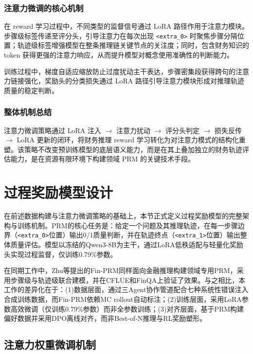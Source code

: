 \documentclass[professional,privacy,print,win,long,STEM,AutoFakeBold]{def/buaa}
\begin{document}
\subsubsection{注意力微调的核心机制}

在 reward 学习过程中，不同类型的监督信号通过 LoRA 路径作用于注意力模块。步骤级标签传递至评分头，引导注意力在每次出现 \texttt{<extra\_0>} 时聚焦步骤分隔位置；轨迹级标签增强模型在整条推理链关键节点的关注度；同时，包含财务知识的 token 获得更强的注意力响应，从而提升模型对概念使用准确性的判断能力。

训练过程中，梯度自适应缩放防止过度扰动主干表达，步骤密集段获得跨句的注意力链接强化，奖励头的分类损失通过 LoRA 路径引导注意力模块形成对推理轨迹质量的稳定判断。

\subsubsection{整体机制总结}

注意力微调策略通过 LoRA 注入 $\rightarrow$ 注意力扰动 $\rightarrow$ 评分头判定 $\rightarrow$ 损失反传 $\rightarrow$ LoRA 更新的闭环，将财务推理 reward 学习转化为对注意力模式的结构化重塑。该策略不改变预训练模型的底层语义能力，而是在其上叠加独立的财务轨迹评估能力，是在资源有限环境下构建领域 PRM 的关键技术手段。


\section{过程奖励模型设计}

在前述数据构建与注意力微调策略的基础上，本节正式定义过程奖励模型的完整架构与训练机制。PRM的核心任务是：给定一个问题及其推理轨迹，在每一步骤边界（\texttt{<extra\_0>}位置）输出0/1质量判断，并在轨迹终点（\texttt{<extra\_1>}位置）输出整体质量评估。模型以冻结的Qwen3-8B为主干，通过LoRA低秩适配与轻量化奖励头实现过程监督，仅训练0.79\%参数。

在同期工作中，Zhu等提出的Fin-PRM同样面向金融推理构建领域专用PRM，采用步骤级与轨迹级联合建模，并在CFLUE和FinQA上验证了效果。与之相比，本工作的差异化在于：(1)数据层面，通过三Agent协作管道配合七种系统性错误注入合成训练数据，而Fin-PRM依赖MC rollout自动标注；(2)训练层面，采用LoRA参数高效微调（仅训练0.79\%参数）而非全参数训练；(3)对齐层面，基于PRM构建偏好数据并采用DPO离线对齐，而非Best-of-N推理与RL奖励塑形。

\subsection{注意力权重微调机制}
\end{document}
